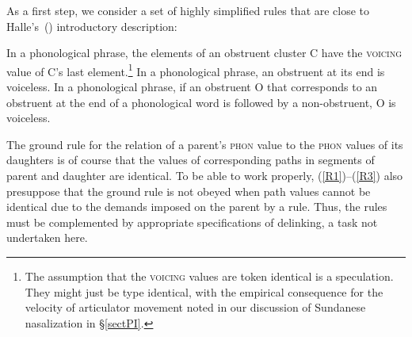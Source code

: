 \documentclass[output=paper]{langsci/langscibook}
\begin{document}
As a first step, we consider a set of highly simplified rules that are
close to Halle's~() introductory description:
%
\begin{exe}
\ex
\label{R1} In a phonological phrase, the elements of an
  obstruent cluster C have the \textsc{voicing} value of C's last
  element.\footnote{%
  	The assumption that the \textsc{voicing} values are
   token identical is a speculation. They might just be type identical,
   with the empirical consequence for the velocity of articulator movement
   noted in our discussion of Sundanese nasalization in \S\ref{sectPI}.%
}
\ex
\label{R2} In a phonological phrase, an obstruent at its end
  is voiceless.
%
\ex
\label{R3} In a phonological phrase, if an obstruent O that
  corresponds to an obstruent at the end of a phonological word is followed
  by a non-obstruent, O is voiceless.
\end{exe}
The ground rule for the relation of a parent's \textsc{phon} value to the \textsc{phon} values of its daughters is of course that the values of
corresponding paths in segments of parent and daughter are identical. To be
able to work proper\-ly, (\ref{R1})--(\ref{R3}) also presuppose that the
ground rule is not obeyed when path values cannot be identical due to the
demands imposed on the parent by a rule. Thus, the rules must be
complemented by appropriate specifications of delinking, a task not
undertaken here.
\end{document}
